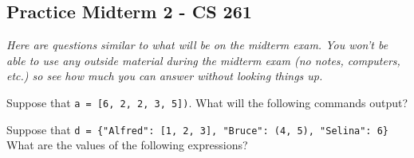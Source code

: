 \documentclass[12pt]{exam}
\begin{document}
\pagestyle{empty}
\graphicspath{{/home/brian/Dropbox/HSC/Spring16/Math111/}}

\subsection*{Practice Midterm 2 - CS 261}
\textit{Here are questions similar to what will be on the midterm exam.  You won't be able to use any outside material during the midterm exam (no notes, computers, etc.) so see how much you can answer without looking things up.}

\begin{questions}

\question Suppose that \lstinline{a = [6, 2, 2, 3, 5])}. What will the following commands output?  


\begin{solution}
\end{solution}
 

\question Suppose that \verb|d = {"Alfred": [1, 2, 3], "Bruce": (4, 5), "Selina": 6}|
What are the values of the following expressions? 

\end{questions}
\end{document}
